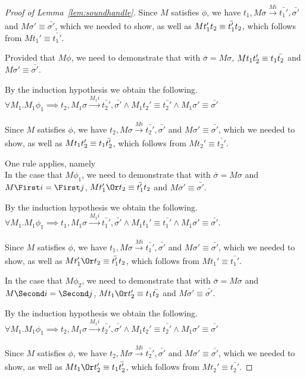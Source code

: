 \begin{proof}[Proof of Lemma~\ref{lem:soundhandle}]
{{    Since $M$ satisfies $\phi$, we have $t_1,M\sigma\xrightarrow[]{M i} \bar{t_1'},\bar{\sigma'}$ and $M\sigma'\equiv\bar{\sigma'}$,
    which we needed to show, as well as $M t_1'\relax t_2\equiv \bar{t_1'}\relax t_2$, which follows from $M t_1' \equiv \bar{t_1'}$.

    }
    {Provided that $M\phi$, we need to demonstrate that  with $\bar{\sigma}=M\sigma$,
    $M t_1\relax t_2'\equiv t_1\relax \bar{t_2}$ and $M\sigma'\equiv \bar{\sigma'}$.

    By the induction hypothesis we obtain the following.\\
    $\forall M_1 . M_1 \phi_1 \implies t_2,M_1\sigma \xrightarrow[]{M_1 i} \bar{t_2'},\bar{\sigma'}\land M_1 t_2'\equiv\bar{t_2'}\land M_1\sigma' \equiv \bar{\sigma'}$

    Since $M$ satisfies $\phi$, we have $t_2,M\sigma\xrightarrow[]{M i} \bar{t_2'},\bar{\sigma'}$ and $M\sigma'\equiv\bar{\sigma'}$,
    which we needed to show, as well as $M t_1\relax t_2'\equiv t_1\relax \bar{t_2'}$, which follows from $M t_2' \equiv \bar{t_2'}$.}
  }

  {One rule applies, namely \\

  In the case that $M\phi_1$, we need to demonstrate that  with $\bar{\sigma}=M\sigma$ and $M\First i =\First j$,
  $M t_1'\Or t_2\equiv \bar{t_1'}\And t_2$ and $M\sigma'\equiv \bar{\sigma'}$.

  By the induction hypothesis we obtain the following.\\
  $\forall M_1 . M_1 \phi_1 \implies t_1,M_1\sigma \xrightarrow[]{M_1 i} \bar{t_1'},\bar{\sigma'}\land M_1 t_1'\equiv\bar{t_1'}\land M_1\sigma' \equiv \bar{\sigma'}$.

  Since $M$ satisfies $\phi$, we have $t_1,M\sigma\xrightarrow[]{M i} \bar{t_1'},\bar{\sigma'}$ and $M\sigma'\equiv\bar{\sigma'}$,
  which we needed to show, as well as $M t_1'\Or t_2\equiv \bar{t_1'}\And t_2$, which follows from $M t_1' \equiv \bar{t_1'}$.

  In the case that $M\phi_2$, we need to demonstrate that  with $\bar{\sigma}=M\sigma$ and $M\Second i = \Second j$,
  $M t_1\Or t_2'\equiv t_1\And \bar{t_2}$ and $M\sigma'\equiv \bar{\sigma'}$.

  By the induction hypothesis we obtain the following.\\
  $\forall M_1 . M_1 \phi_1 \implies t_2,M_1\sigma \xrightarrow[]{M_1 i} \bar{t_2'},\bar{\sigma'}\land M_1 t_2'\equiv\bar{t_2'}\land M_1\sigma' \equiv \bar{\sigma'}$

  Since $M$ satisfies $\phi$, we have $t_2,M\sigma\xrightarrow[]{M i} \bar{t_2'},\bar{\sigma'}$ and $M\sigma'\equiv\bar{\sigma'}$,
  which we needed to show, as well as $M t_1\Or t_2'\equiv t_1\And \bar{t_2'}$, which follows from $M t_2' \equiv \bar{t_2'}$.}


\end{proof}




